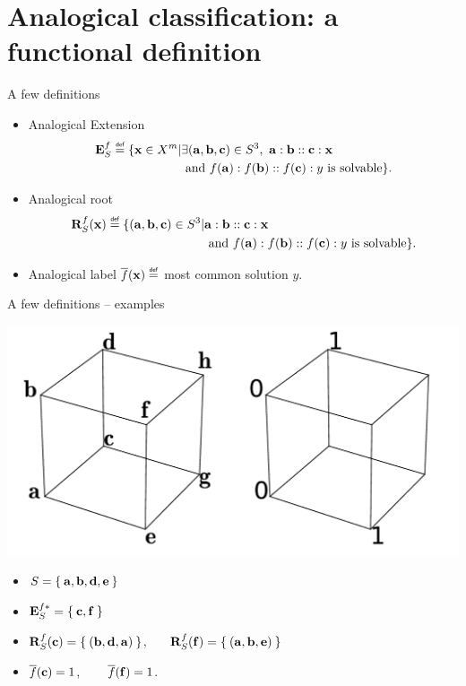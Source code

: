 \documentclass{beamer}
\begin{document}
\section[Analogical classification]{Analogical classification: a functional definition}

\begin{frame}{A few definitions}
  \begin{itemize}
    \item \alert{Analogical Extension}
        \begin{align*}
          \esf \eqdef \{ \mathbf{x} \in X^m |  &\exists
          (\mathbf{a},\mathbf{b},\mathbf{c}) \in S^3, ~ \mathbf{a} : \mathbf{b}
          :: \mathbf{c} : \mathbf{x}\\
          &\text{ and } f(\mathbf{a}) : f(\mathbf{b}) ::
          f(\mathbf{c}) : y \text{ is solvable}\}.
        \end{align*}
      \item \alert{Analogical root}
      \begin{align*}
        \rsfx \eqdef \{(\mathbf{a}, \mathbf{b}, \mathbf{c}) \in S^3 |
        &\mathbf{a}:\mathbf{b}::\mathbf{c}:\mathbf{x}\\ &\text{ and }
        f(\mathbf{a}):f(\mathbf{b})::f(\mathbf{c}):y \text{ is solvable}\}.
      \end{align*}

    \item \alert{Analogical label}
      $\albl{\mathbf{x}} \eqdef $ most common solution $y$.
  \end{itemize}
\end{frame}

\begin{frame}{A few definitions -- examples}
  \begin{center}
    \includegraphics[width=.7\textwidth]{figures/ae_example.pdf}
  \end{center}
  \begin{itemize}
    \item$S = \Set{\mathbf{a}, \mathbf{b}, \mathbf{d}, \mathbf{e}}$
    \item $\mathbf{E}_{S}^{f*} = \Set{\mathbf{c}, \mathbf{f}}$
    \item $\mathbf{R}_{S}^{f}(\mathbf{c}) = \Set{(\mathbf{b}, \mathbf{d},
      \mathbf{a})}$,~~~ $\mathbf{R}_{S}^{f}(\mathbf{f}) = \Set{(\mathbf{a}, \mathbf{b},
      \mathbf{e})}$
    \item $\overline{f}(\mathbf{c}) = 1$, ~~~ $\overline{f}(\mathbf{f}) = 1$.
  \end{itemize}
\end{frame}
\end{document}
